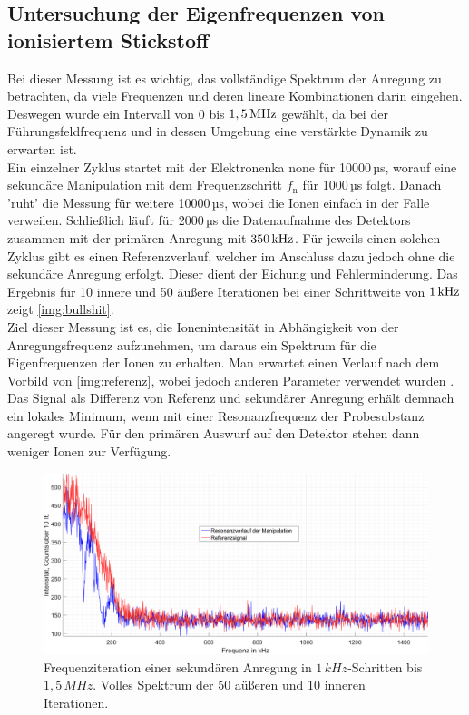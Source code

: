 \documentclass[numbers=noenddot,a4paper,notitlepage,twoside,BCOR15mm]{scrartcl}
\newcommand{\ix}[1]{_\text{#1}}
\begin{document}
		\subsection{Untersuchung der Eigenfrequenzen von ionisiertem Stickstoff}\label{subsec:mess}

			Bei dieser Messung ist es wichtig, das vollständige Spektrum der Anregung zu betrachten, da viele Frequenzen und deren lineare Kombinationen darin eingehen. Deswegen wurde ein Intervall von 0 bis $\unit[1,5]{MHz}$ gewählt, da bei der Führungsfeldfrequenz und in dessen Umgebung eine verstärkte Dynamik zu erwarten ist.\\
			Ein einzelner Zyklus startet mit der Elektronenka none für 10000\,µs, worauf eine sekundäre Manipulation mit dem Frequenzschritt $f\ix{n}$ für 1000\,µs folgt. Danach 'ruht' die Messung für weitere 10000\,µs, wobei die Ionen einfach in der Falle verweilen. Schließlich läuft für 2000\,µs die Datenaufnahme des Detektors zusammen mit der primären Anregung mit $\unit[350]{kHz}$. Für jeweils einen solchen Zyklus gibt es einen Referenzverlauf, welcher im Anschluss dazu jedoch ohne die sekundäre Anregung erfolgt. Dieser dient der Eichung und Fehlerminderung. Das Ergebnis für 10 innere und 50 äußere Iterationen bei einer Schrittweite von $\unit[1]{kHz}$ zeigt \autoref{img:bullshit}.\\
			Ziel dieser Messung ist es, die Ionenintensität in Abhängigkeit von der Anregungsfrequenz aufzunehmen, um daraus ein Spektrum für die Eigenfrequenzen der Ionen zu erhalten. Man erwartet einen Verlauf nach dem Vorbild von \autoref{img:referenz}, wobei jedoch anderen Parameter verwendet wurden \cite{Paul-FalleREF}. Das Signal als Differenz von Referenz und sekundärer Anregung erhält demnach ein lokales Minimum, wenn mit einer Resonanzfrequenz der Probesubstanz angeregt wurde. Für den primären Auswurf auf den Detektor stehen dann weniger Ionen zur Verfügung.

				\begin{figure}
					\includegraphics[width=\textwidth]{volle_daten.png}
					\caption{Frequenziteration einer sekundären Anregung in $1\,kHz$-Schritten bis $1,5\,MHz$. Volles Spektrum der 50 aüßeren und 10 inneren Iterationen.}\label{img:bullshit}
				\end{figure}
\end{document}
